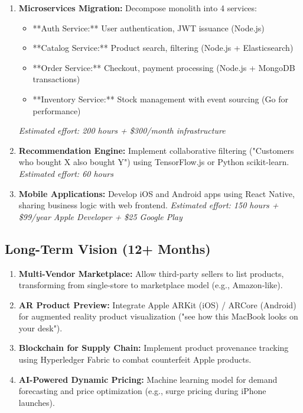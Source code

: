 \documentclass[12pt, a4paper]{report}
\begin{document}
\begin{enumerate}
    \item \textbf{Microservices Migration:} Decompose monolith into 4 services:
    \begin{itemize}
        \item **Auth Service:** User authentication, JWT issuance (Node.js)
        \item **Catalog Service:** Product search, filtering (Node.js + Elasticsearch)
        \item **Order Service:** Checkout, payment processing (Node.js + MongoDB transactions)
        \item **Inventory Service:** Stock management with event sourcing (Go for performance)
    \end{itemize}
    \textit{Estimated effort: 200 hours + \$300/month infrastructure}
    
    \item \textbf{Recommendation Engine:} Implement collaborative filtering ("Customers who bought X also bought Y") using TensorFlow.js or Python scikit-learn.
    \textit{Estimated effort: 60 hours}
    
    \item \textbf{Mobile Applications:} Develop iOS and Android apps using React Native, sharing business logic with web frontend.
    \textit{Estimated effort: 150 hours + \$99/year Apple Developer + \$25 Google Play}
\end{enumerate}

\subsection{Long-Term Vision (12+ Months)}

\begin{enumerate}
    \item \textbf{Multi-Vendor Marketplace:} Allow third-party sellers to list products, transforming from single-store to marketplace model (e.g., Amazon-like).
    
    \item \textbf{AR Product Preview:} Integrate Apple ARKit (iOS) / ARCore (Android) for augmented reality product visualization ("see how this MacBook looks on your desk").
    
    \item \textbf{Blockchain for Supply Chain:} Implement product provenance tracking using Hyperledger Fabric to combat counterfeit Apple products.
    
    \item \textbf{AI-Powered Dynamic Pricing:} Machine learning model for demand forecasting and price optimization (e.g., surge pricing during iPhone launches).
\end{enumerate}
\end{document}

